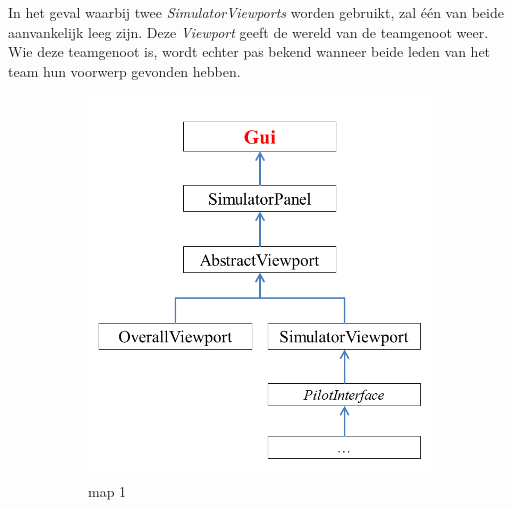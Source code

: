\documentclass[tt1]{penoverslag}
\begin{document}
In het geval waarbij twee \textit{SimulatorViewports} worden gebruikt, zal \'e\'en van beide aanvankelijk leeg zijn. Deze \textit{Viewport} geeft de wereld van de teamgenoot weer. Wie deze teamgenoot is, wordt echter pas bekend wanneer beide leden van het team hun voorwerp gevonden hebben.\\
\begin{landscape}

\begin{figure}
\centering
	\begin{subfigure}[hb]{0.52\textwidth}
	\centering
		\includegraphics[width=\textwidth]{KlasGUI}
		\caption{map 1}
	\end{subfigure}%
	\begin{subfigure}[hb]{0.52\textwidth}
		\centering

\end{subfigure}
\end{figure}
\end{landscape}
\end{document}

